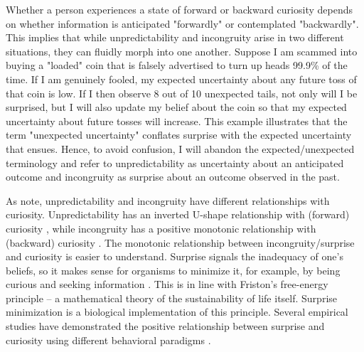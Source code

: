 Whether a person experiences a state of forward or backward curiosity depends on whether information is anticipated "forwardly" or contemplated "backwardly". This implies that while unpredictability and incongruity arise in two different situations, they can fluidly morph into one another. Suppose I am scammed into buying a "loaded" coin that is falsely advertised to turn up heads 99.9\% of the time. If I am genuinely fooled, my expected uncertainty about any future toss of that coin is low. If I then observe 8 out of 10 unexpected tails, not only will I be surprised, but I will also update my belief about the coin so that my expected uncertainty about future tosses will increase. This example illustrates that the term "unexpected uncertainty" conflates surprise \parencite{barto_novelty_2013} with the expected uncertainty that ensues. Hence, to avoid confusion, I will abandon the expected/unexpected terminology and refer to unpredictability as uncertainty about an anticipated outcome and incongruity as surprise about an outcome observed in the past.

As \citeauthor{shin_homo_2019} \citeyearpar{shin_homo_2019} note, unpredictability and incongruity have different relationships with curiosity. Unpredictability has an inverted U-shape relationship with (forward) curiosity \parencite{berlyne_theory_1954,day_curiosity_1982,loewenstein_psychology_1994}, while incongruity has a positive monotonic relationship with (backward) curiosity \parencite{horstmann_surprise-attention_2015}. The monotonic relationship between incongruity/surprise and curiosity is easier to understand. Surprise signals the inadequacy of one's beliefs, so it makes sense for organisms to minimize it, for example, by being curious and seeking information \parencite{schwartenbeck_computational_2019}. This is in line with Friston's \parencite{friston_free-energy_2009} free-energy principle -- a mathematical theory of the sustainability of life itself. Surprise minimization is a biological implementation of this principle. Several empirical studies have demonstrated the positive relationship between surprise and curiosity using different behavioral paradigms \parencite{berlyne_experimental_1954,itti_bayesian_2009,poli_infants_2020}.

